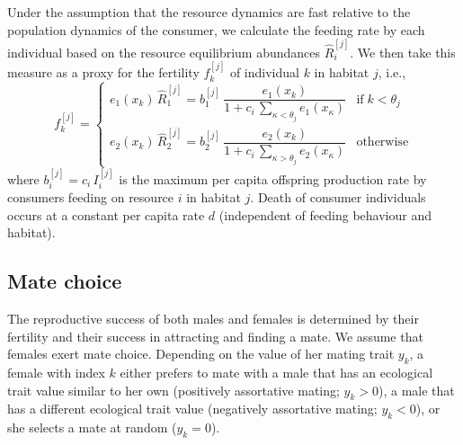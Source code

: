 \documentclass[11pt]{article}
\newcommand{\scr}[3]{\ensuremath{{#1}_{#2}^{[#3]}}}
\begin{document}
Under the assumption that the resource dynamics are fast relative to the population dynamics of the consumer, we calculate the feeding rate by each individual based on the resource equilibrium abundances \scr{\hat{R}}{i}{j}. We then take this measure as a proxy for the fertility \scr{f}{k}{j} of individual $k$ in habitat $j$, i.e.,
\begin{equation}
\label{eq:fertility}
\scr{f}{k}{j} = \left\{
\begin{array}{ll}
e_1(x_k) \, \scr{\hat{R}}{1}{j} = \scr{b}{1}{j}\,\dfrac{e_1(x_k)}{1 +  c_i\,\sum_{\kappa < \theta_j} e_1(x_\kappa)}  & \mathrm{if}\; k < \theta_j\\
e_2(x_k) \, \scr{\hat{R}}{2}{j} = \scr{b}{2}{j}\,\dfrac{e_2(x_k)}{1 +  c_i\,\sum_{\kappa > \theta_j} e_2(x_\kappa)} & \mathrm{otherwise}
\end{array}
\right.
\end{equation}
where $\scr{b}{i}{j} = c_i\,\scr{I}{i}{j}$ is the maximum per capita offspring production rate by consumers feeding on resource $i$ in habitat $j$. Death of consumer individuals occurs at a constant per capita rate $d$ (independent of feeding behaviour and habitat). 
 
\subsection*{Mate choice}
The reproductive success of both males and females is determined by their fertility and their success in attracting and finding a mate. We assume that females exert mate choice. Depending on the value of her mating trait $y_k$, a female with index $k$ either prefers to mate with a male that has an ecological trait value similar to her own (positively assortative mating; $y_k>0$), a male that has a different ecological trait value (negatively assortative mating; $y_k<0$), or she selects a mate at random ($y_k = 0$).
\end{document}
